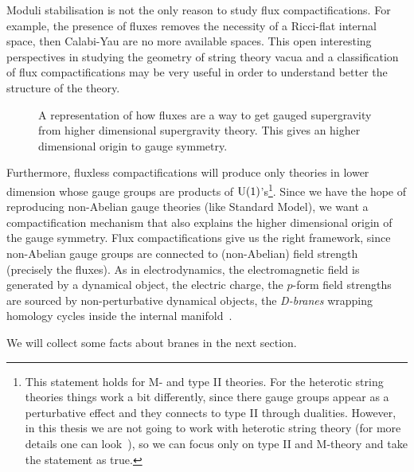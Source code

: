 \documentclass[draft]{phd}
\begin{document}
			Moduli stabilisation is not the only reason to study flux compactifications.
			For example, the presence of fluxes removes the necessity of a Ricci-flat internal space, then Calabi-Yau are no more available spaces.
			This open interesting perspectives in studying the geometry of string theory vacua and a classification of flux compactifications may be very useful in order to understand better the structure of the theory.
				
					\begin{figure}[h!]
						\centering
						
						\caption{	A representation of how fluxes are a way to get gauged supergravity from higher dimensional supergravity theory.
								This gives an higher dimensional origin to gauge symmetry.}
						\label{gaugedsugra}
					\end{figure}
				
			Furthermore, fluxless compactifications will produce only theories in lower dimension whose gauge groups are products of $\mathrm{U}(1)$'s\footnote{%
				This statement holds for M- and type II theories.
				For the heterotic string theories things work a bit differently, since there gauge groups appear as a perturbative effect and they connects to type II through dualities.
				However, in this thesis we are not going to work with heterotic string theory (for more details one can look~\cite{polchinski}), so we can focus only on type II and M-theory and take the statement as true.}.
			Since we have the hope of reproducing non-Abelian gauge theories (like Standard Model), we want a compactification mechanism that also explains the higher dimensional origin of the gauge symmetry.
			Flux compactifications give us the right framework, since non-Abelian gauge groups are connected to (non-Abelian) field strength (precisely the fluxes).
			As in electrodynamics, the electromagnetic field is generated by a dynamical object, the electric charge, the $p$-form field strengths are sourced by non-perturbative dynamical objects, the \emph{D-branes} wrapping homology cycles inside the internal manifold~\cite{PolchinskiBranes}.
				
			We will collect some facts about branes in the next section.
			
\end{document}
